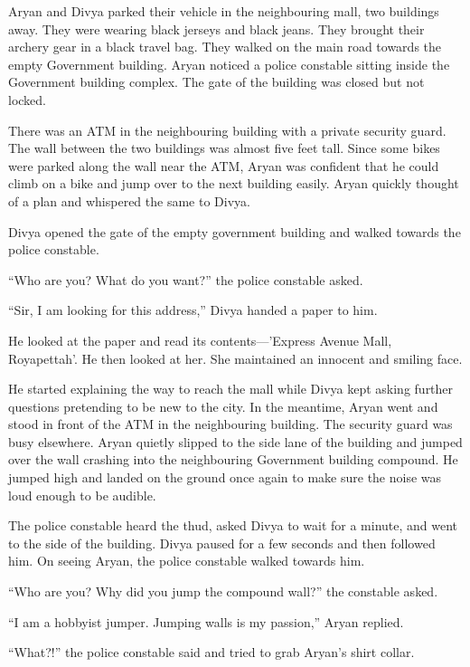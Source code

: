 Aryan and Divya parked their vehicle in the neighbouring mall, two buildings
away. They were wearing black jerseys and black jeans. They brought their
archery gear in a black travel bag. They walked on the main road towards the
empty Government building. Aryan noticed a police constable sitting inside the
Government building complex. The gate of the building was closed but not locked.

There was an ATM in the neighbouring building with a private security guard. The
wall between the two buildings was almost five feet tall. Since some bikes were
parked along the wall near the ATM, Aryan was confident that he could climb on a
bike and jump over to the next building easily. Aryan quickly thought of a plan
and whispered the same to Divya.

Divya opened the gate of the empty government building and walked towards the
police constable.

“Who are you? What do you want?” the police constable asked.

“Sir, I am looking for this address,” Divya handed a paper to him.

He looked at the paper and read its contents—'Express Avenue Mall,
Royapettah'. He then looked at her. She maintained an innocent and smiling face.

He started explaining the way to reach the mall while Divya kept asking further
questions pretending to be new to the city. In the meantime, Aryan went and
stood in front of the ATM in the neighbouring building. The security guard was
busy elsewhere. Aryan quietly slipped to the side lane of the building and
jumped over the wall crashing into the neighbouring Government building compound.
He jumped high and landed on the ground once again to make sure the noise was
loud enough to be audible.

The police constable heard the thud, asked Divya to wait for a minute, and went
to the side of the building. Divya paused for a few seconds and then followed
him. On seeing Aryan, the police constable walked towards him.

“Who are you? Why did you jump the compound wall?” the constable asked.

“I am a hobbyist jumper. Jumping walls is my passion,” Aryan replied.

“What?!” the police constable said and tried to grab Aryan's shirt collar.

